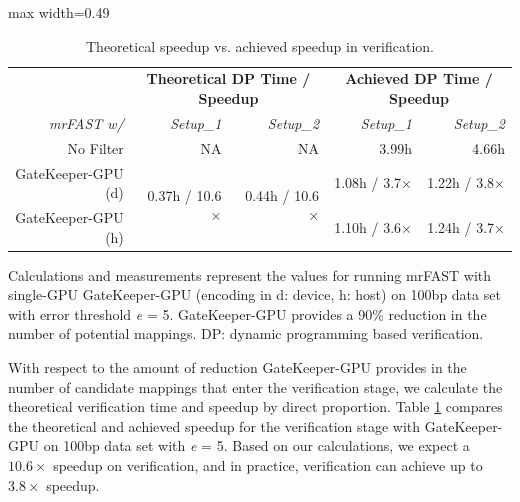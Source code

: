 \begin{table}[!htbp]
\caption{Theoretical speedup vs. achieved speedup in verification.}
\label{tab:theoreticalvsachieved}
\begin{adjustbox}{max width=0.49\textwidth}
\begin{tabular}{r|rr|rr}
\multicolumn{1}{r}{}                     & \multicolumn{2}{c}{\textbf{Theoretical DP Time / Speedup} }                     & \multicolumn{2}{c}{\textbf{Achieved DP Time / Speedup} }  \\
\multicolumn{1}{r}{ \textit{mrFAST w/} } & \textit{Setup\_1}                      & \multicolumn{1}{r}{\textit{Setup\_2} } & \textit{Setup\_1}    & \textit{Setup\_2}                  \\ 
\hline  \rule{0pt}{2ex}
No Filter                                & NA                                     & NA                                     & 3.99h                & 4.66h                              \\ 
\hline  \rule{0pt}{2ex}
GateKeeper-GPU (d)                       & \multirow{2}{*}{0.37h / 10.6$\times$ } & \multirow{2}{*}{0.44h / 10.6$\times$ } & 1.08h / 3.7$\times$  & 1.22h / 3.8$\times$                \\
GateKeeper-GPU (h)                       &                                        &                                        & 1.10h / 3.6$\times$  & 1.24h / 3.7$\times$                \\
\hline
\end{tabular}
\end{adjustbox}
\begin{minipage}{0.49\textwidth}
\vspace*{0.2cm}
\scriptsize
Calculations and measurements represent the values for running mrFAST with single-GPU GateKeeper-GPU (encoding in d: device, h: host) on 100bp data set with error threshold \textit{e} = 5. GateKeeper-GPU provides a 90\% reduction in the number of potential mappings. DP: dynamic programming based verification.
\end{minipage}
\end{table}

With respect to the amount of reduction GateKeeper-GPU provides in the number of candidate mappings that enter the verification stage, we calculate the theoretical verification time and speedup by direct proportion. Table \ref{tab:theoreticalvsachieved} compares the theoretical and achieved speedup for the verification stage with GateKeeper-GPU on 100bp data set with \textit{e} = 5. Based on our calculations, we expect a $10.6\times$ speedup on verification, and in practice, verification can achieve up to $3.8\times$ speedup. 

